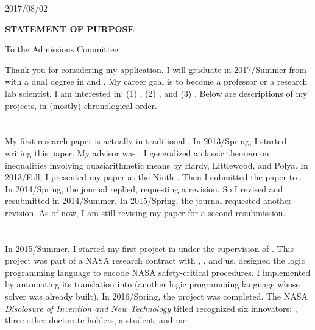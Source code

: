 \documentclass[letterpaper, 12pt]{extarticle}
\begin{document}
2017/08/02 \myskipbig

\textbf{STATEMENT OF PURPOSE} \\ \vp \myskipbig


To the \phd{} Admissions Committee: \myskip

Thank you for considering my application.
I will graduate in 2017/Summer
from \ttu{} with a dual \bs{} degree in \cs{} and \maths.
My career goal is to become
a professor or
a research lab scientist.
I am interested in: (1) \pl, (2) \ai, and (3) \ct.
Below are descriptions of my projects,
in (mostly) chronological order.

\myrule

\section{\ma}

My first research paper
is actually in traditional \maths.
In 2013/Spring, I started writing this \ma{} paper.
My advisor was \aglong.
I generalized a classic theorem on inequalities involving
quasiarithmetic means by Hardy, Littlewood, and Polya.
In 2013/Fall, I presented my paper at the Ninth \tumc.
Then I submitted the paper to \rh.
In 2014/Spring, the journal replied, requesting a revision.
So I revised and resubmitted in 2014/Summer.
In 2015/Spring, the journal requested another revision.
As of now, I am still revising my paper
for a second resubmission.

\section{\pl}

In 2015/Summer, I started my first project in \pl{} under
the supervision of \nrlong.
This project was part of a NASA research contract with \kt,
\hi, and us.
\nr{} designed the logic programming language \llang{}
to encode NASA safety-critical procedures.
I implemented \llang{} by automating its translation into
\aplong{}
(another logic programming language
whose solver was already built).
In 2016/Spring, the project was completed.
The NASA \textit
{Disclosure of Invention and New Technology}
titled \disclosureNASA{}
recognized six innovators:
\nr, three other doctorate holders,
a \phd{} student, and me.
\end{document}
